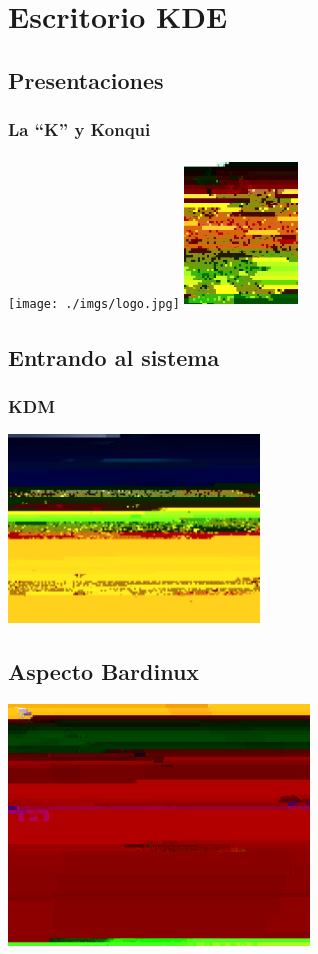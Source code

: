 \section{Escritorio KDE}
\subsection{Presentaciones}
\frame
{
  \frametitle{La ``K'' y Konqui}
  \begin{center}
    \texttt{[image: ./imgs/logo.jpg]}
    \hspace{2cm}
    \includegraphics[height=4cm,width=3cm]{./imgs/konqui.jpg}
  \end{center}
}

\subsection{Entrando al sistema}
\frame
{
  \frametitle{KDM}
  \begin{center}
    \includegraphics[height=5cm]{./imgs/kdm}
  \end{center}

}
\subsection{Aspecto Bardinux}
\frame
{
	\begin{center}
		\includegraphics[width=8cm]{./imgs/kde_bardinux.jpg}
	\end{center}
}
